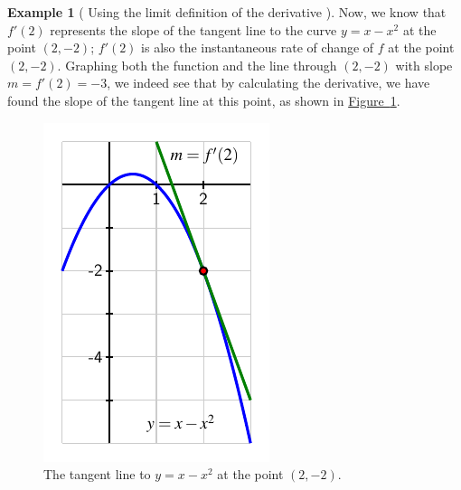 \documentclass[10pt,]{book}
\theoremstyle{plain}
\theoremstyle{definition}
\theoremstyle{definition}
\theoremstyle{definition}
\newtheorem{example}[theorem]{Example}
\theoremstyle{definition}
\theoremstyle{definition}
\numberwithin{equation}{section}
\begin{document}
\begin{example}[ Using the limit definition of the derivative
  ]
    Now, we know that \(f'(2)\) represents the slope of the tangent line to the curve \(y = x - x^2\) at the point \((2,-2)\); \(f'(2)\) is also the instantaneous rate of change of \(f\) at the point \((2,-2)\). Graphing both the function and the line through \((2,-2)\) with slope \(m = f'(2) = -3\), we indeed see that by calculating the derivative, we have found the slope of the tangent line at this point, as shown in \hyperref[F-1-3-Ex1]{Figure~\ref{F-1-3-Ex1}}.
\leavevmode%
\begin{figure}
\centering
\includegraphics[width=0.5\linewidth]{images/1_3_Ex1}
\caption{The tangent line to \(y = x - x^2\) at the point \((2,-2)\).\label{F-1-3-Ex1}}
\end{figure}
\end{example}
\par
\end{document}
